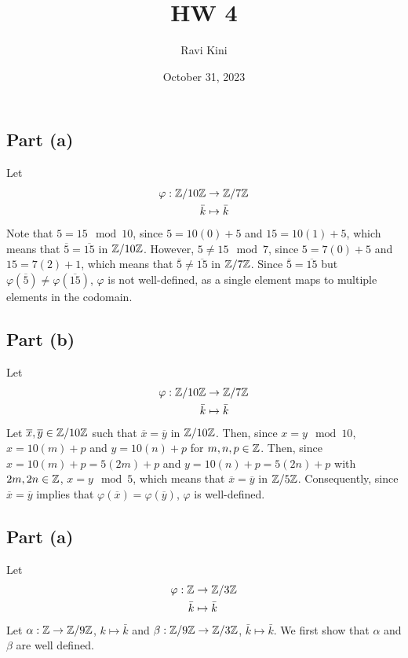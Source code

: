 \documentclass{article}
\title{HW 4}
\author{Ravi Kini}
\date{October 31, 2023}
\begin{document}
\maketitle

\problem
\subsection*{Part (a)}
Let
\begin{equation}
    \begin{split}
        \varphi: \mathbb{Z}/10\mathbb{Z} & \to \mathbb{Z}/7\mathbb{Z} \\
            \bar k &  \mapsto \bar k
    \end{split}
\end{equation}
Note that $5 = 15 \mod 10$, since $5 = 10\left(0\right) + 5$ and $15 = 10\left(1\right) + 5$, which means that $\overline{5} = \overline{15}$ in $\mathbb{Z}/10\mathbb{Z}$. However, $5 \neq 15 \mod 7$, since $5 = 7\left(0\right) + 5$ and $15 = 7\left(2\right) + 1$, which means that $\overline{5} \neq \overline{15}$ in $\mathbb{Z}/7\mathbb{Z}$. Since $\overline{5} = \overline{15}$ but $\varphi\left(\overline{5}\right) \neq \varphi\left(\overline{15}\right)$, $\varphi$ is not well-defined, as a single element maps to multiple elements in the codomain. 
\subsection*{Part (b)}
Let
\begin{equation}
    \begin{split}
        \varphi: \mathbb{Z}/10\mathbb{Z} & \to \mathbb{Z}/7\mathbb{Z} \\
            \bar k &  \mapsto \bar k
    \end{split}
\end{equation}
Let $\overline{x}, \overline{y} \in \mathbb{Z}/10\mathbb{Z}$ such that $\overline{x} = \overline{y}$ in $\mathbb{Z}/10\mathbb{Z}$. Then, since $x = y \mod 10$, $x = 10\left(m\right) + p$ and $y = 10\left(n\right) + p$ for $m, n, p \in \mathbb{Z}$. Then, since $x = 10\left(m\right) + p = 5\left(2m\right) + p$ and $y = 10\left(n\right) + p = 5\left(2n\right) + p$ with $2m, 2n \in \mathbb{Z}$, $x = y \mod 5$, which means that $\overline{x} = \overline{y}$ in $\mathbb{Z}/5\mathbb{Z}$. Consequently, since $\overline{x} = \overline{y}$ implies that $\varphi\left(\overline{x}\right) = \varphi\left(\overline{y}\right)$, $\varphi$ is well-defined.

\newpage

\problem
\subsection*{Part (a)}
Let
\begin{equation}
    \begin{split}
        \varphi: \mathbb{Z} & \to \mathbb{Z}/3\mathbb{Z} \\
            \bar k &  \mapsto \bar k
    \end{split}
\end{equation}
Let $\alpha: \mathbb{Z} \to \mathbb{Z}/9\mathbb{Z}$, $k \mapsto \bar k$ and $\beta: \mathbb{Z}/9\mathbb{Z} \to \mathbb{Z}/3\mathbb{Z}$, $\bar k \mapsto \bar k$. We first show that $\alpha$ and $\beta$ are well defined.
\end{document}
